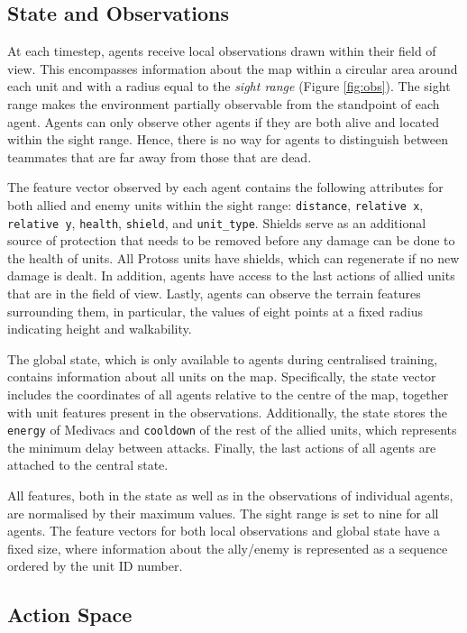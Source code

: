 \documentclass[twoside,11pt]{article}
\begin{document}
\subsection{State and Observations}\label{section:state_and_obs}

At each timestep, agents receive local observations drawn within their field of view. This  encompasses information about the map within a circular area around each unit and with a radius equal to the \textit{sight range} (Figure \ref{fig:obs}). The sight range makes the environment partially observable from the standpoint of each agent. Agents can only observe other agents if they are both alive and located within the sight range. Hence, there is no way for agents to distinguish between teammates that are far away from those that are dead.

The feature vector observed by each agent contains the following attributes for both allied and enemy units within the sight range: \texttt{distance}, \texttt{relative x}, \texttt{relative y}, \texttt{health}, \texttt{shield}, and \texttt{unit\_type}. Shields serve as an additional source of protection that needs to be removed before any damage can be done to the health of units.
All Protoss units have shields, which can regenerate if no new damage is dealt.
In addition, agents have access to the last actions of allied units that are in the field of view. Lastly, agents can observe the terrain features surrounding them, in particular, the values of eight points at a fixed radius indicating height and walkability.

The global state, which is only available to agents during centralised training, contains information about all units on the map. Specifically, the state vector includes the coordinates of all agents relative to the centre of the map, together with unit features present in the observations. Additionally, the state stores the \texttt{energy} of Medivacs and \texttt{cooldown} of the rest of the allied units, which represents the  minimum delay between attacks. Finally, the last actions of all agents are attached to the central state.

All features, both in the state as well as in the observations of individual agents, are normalised by their maximum values. The sight range is set to nine for all agents. The feature vectors for both local observations and global state have a fixed size, where information about the ally/enemy is represented as a sequence ordered by the unit ID number.

\subsection{Action Space}
\end{document}
